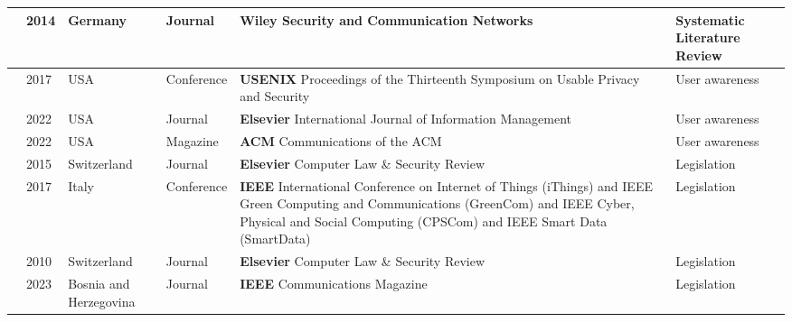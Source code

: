 \begin{footnotesize}
\begin{longtable}{p{1.2cm} p{1cm} p{1.6cm} p{3.2cm} p{5cm} p{3cm}}
        \hline
        \cite{ziegeldorf2014privacy} & 2014 & Germany & Journal & \textbf{Wiley} Security and Communication Networks & Systematic Literature Review \\
        \hline
        \cite{naeini2017privacy} & 2017 & USA & Conference & \textbf{USENIX} Proceedings of the Thirteenth Symposium on Usable Privacy and Security & User awareness \\
        \hline
        \cite{koohang2022internet} & 2022 & USA & Journal & \textbf{Elsevier} International Journal of Information Management & User awareness \\
        \hline
        \cite{SkirpanPrivacy} & 2022 & USA & Magazine & \textbf{ACM} Communications of the ACM & User awareness \\
        \hline
        \cite{WEBER2015618} & 2015 & Switzerland & Journal & \textbf{Elsevier} Computer Law \& Security Review & Legislation \\
        \hline
        \cite{FabianoInternet} & 2017 & Italy & Conference & \textbf{IEEE} International Conference on Internet of Things (iThings) and IEEE Green Computing and Communications (GreenCom) and IEEE Cyber, Physical and Social Computing (CPSCom) and IEEE Smart Data (SmartData) & Legislation \\
        \hline
        \cite{weber2010internet} & 2010 & Switzerland & Journal & \textbf{Elsevier} Computer Law \& Security Review & Legislation \\
        \hline
        \cite{hadzovic2023path} & 2023 & Bosnia and Herzegovina & Journal & \textbf{IEEE} Communications Magazine & Legislation \\
        \hline

\end{longtable}
\end{footnotesize}
